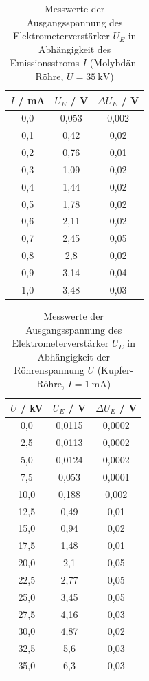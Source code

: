 \documentclass{article}
\begin{document}
\begin{table}[H]
    \centering
    \caption{Messwerte der Ausgangsspannung des Elektrometerverstärker $U_E$ in Abhängigkeit des Emissionsstroms $I$ (Molybdän-Röhre, $U = \SI{35}{\kilo\volt}$)}
    \begin{tabular}{|c|c|c|}
        \hline
        $I$ / \si{\milli\ampere} & $U_E$ / \si{\volt} & $\Delta U_E$ / \si{\volt} \\ \hline \hline
         0,0 & 0,053 & 0,002 \\ \hline
         0,1 & 0,42 & 0,02 \\ \hline
         0,2 & 0,76 & 0,01 \\ \hline
         0,3 & 1,09 & 0,02 \\ \hline
         0,4 & 1,44 & 0,02 \\ \hline
         0,5 & 1,78 & 0,02 \\ \hline
         0,6 & 2,11 & 0,02 \\ \hline
         0,7 & 2,45 & 0,05 \\ \hline
         0,8 & 2,8 & 0,02 \\ \hline
         0,9 & 3,14 & 0,04 \\ \hline
         1,0 & 3,48 & 0,03 \\ \hline
    \end{tabular}
    \label{tab:MesswerteDosimetrie2a}
\end{table}

\begin{table}[H]
    \centering
    \caption{Messwerte der Ausgangsspannung des Elektrometerverstärker $U_E$ in Abhängigkeit der Röhrenspannung $U$ (Kupfer-Röhre, $I = \SI{1}{\milli\ampere}$)}
    \begin{tabular}{|c|c|c|}
        \hline
        $U$ / \si{\kilo\volt} & $U_E$ / \si{\volt} & $\Delta U_E$ / \si{\volt} \\ \hline \hline
         0,0 & 0,0115 & 0,0002 \\ \hline
         2,5 & 0,0113 & 0,0002 \\ \hline
         5,0 & 0,0124 & 0,0002 \\ \hline
         7,5 & 0,053 & 0,0001 \\ \hline
         10,0 & 0,188 & 0,002 \\ \hline
         12,5 & 0,49 & 0,01 \\ \hline
         15,0 & 0,94 & 0,02 \\ \hline
         17,5 & 1,48 & 0,01 \\ \hline
         20,0 & 2,1 & 0,05 \\ \hline
         22,5 & 2,77 & 0,05 \\ \hline
         25,0 & 3,45 & 0,05 \\ \hline
         27,5 & 4,16 & 0,03 \\ \hline
         30,0 & 4,87 & 0,02 \\ \hline
         32,5 & 5,6 & 0,03 \\ \hline
         35,0 & 6,3 & 0,03 \\ \hline
    \end{tabular}
    \label{tab:MesswerteDosimetrie2b}
\end{table}
\end{document}
